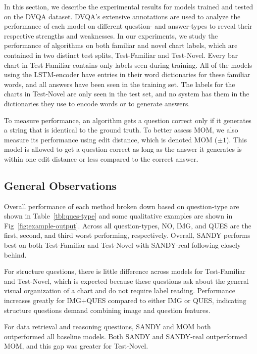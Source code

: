 \documentclass[10pt,twocolumn,letterpaper]{article}
\begin{document}
In this section, we describe the experimental results for models trained and tested on the DVQA dataset. DVQA's extensive annotations are used to analyze the performance of each model on different question- and answer-types to reveal their respective strengths and  weaknesses. In our experiments, we study the performance of algorithms on both familiar and novel chart labels, which are contained in two distinct test splits, Test-Familiar and Test-Novel. Every bar chart in Test-Familiar contains only labels seen during training. All of the models using the LSTM-encoder have entries in their word dictionaries for these familiar words, and all answers have been seen in the training set. The labels for the charts in Test-Novel are only  seen in the test set, and no system has them in the dictionaries they use to encode words or to generate answers.

To measure performance, an algorithm gets a question correct only if it generates a string that is identical to the ground truth. To better assess MOM, we also measure its performance using edit distance, which is denoted MOM ($\pm 1$). This model is allowed to get a question correct as long as the answer it generates is within one edit distance or less compared to the correct answer.

\subsection{General Observations}

Overall performance of each method broken down based on question-type are shown in 
Table~\ref{tbl:ques-type} and some qualitative examples are shown in Fig~\ref{fig:example-output}. Across all question-types, NO, IMG, and QUES  are the first, second, and third worst performing, respectively. Overall, SANDY performs best on both Test-Familiar and Test-Novel with SANDY-real following closely behind.

For structure questions, there is little difference across models for Test-Familiar and Test-Novel, which is expected because these questions ask about the general visual organization of a chart and do not require label reading. Performance increases greatly for IMG+QUES compared to either IMG or QUES, indicating structure questions demand combining image and question features.

For data retrieval and reasoning questions, SANDY and MOM both outperformed all baseline models. Both SANDY and SANDY-real outperformed MOM, and this gap was greater for Test-Novel.
\end{document}
